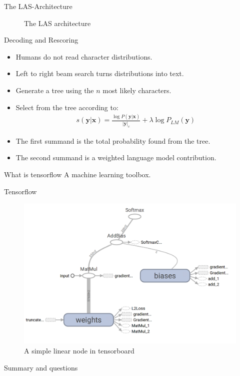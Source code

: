 \documentclass{beamer}
\begin{document}
\begin{frame}{The LAS-Architecture}
\begin{figure}

\caption{The LAS architecture}
\label{fig:las}
\end{figure}
\end{frame}

\begin{frame}{Decoding and Rescoring}
\begin{itemize}
	\item Humans do not read character distributions.
	\item Left to right beam search turns distributions into text.
	\item Generate a tree using the $n$ most likely characters.
	\item Select from the tree according to:
		\begin{align}
		s(\mathbf{y}|\mathbf{x}) = \frac{\log P(\mathbf{y}|\mathbf{x})}{ |\mathbf{y}|_c} + \lambda \log P_{LM}(\mathbf{y})
		\end{align}
	\item The first summand is the total probability found from the tree. 
	\item The second summand is a weighted language model contribution.
\end{itemize}
\end{frame}



\begin{frame}{What is tensorflow}
A machine learning toolbox.
\end{frame}


\begin{frame}{Tensorflow}
\begin{figure}
\centering
\includegraphics[width=0.7\linewidth]{../png/net1}
\caption{A simple linear node in tensorboard}
\label{fig:net1}
\end{figure}
\end{frame}

\begin{frame}{Summary and questions}

\end{frame}
\end{document}
